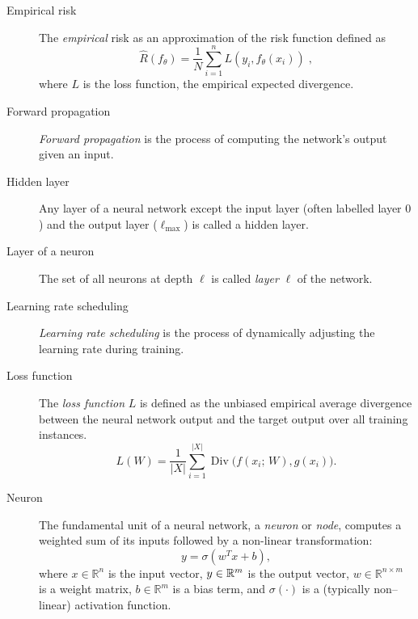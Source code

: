 \begin{description}
\item [Empirical risk]
            The \emph{empirical} risk as an approximation of the risk function defined as
            \begin{equation}
            \hat{{R}}(f_\theta) = \frac{1}{N}\sum_{i=1}^{n}L(y_i, f_\theta(x_i))\;,
        \end{equation}
        where \(L\) is the loss function, the empirical expected divergence.

\item [Forward propagation]
                \emph{Forward propagation} is the process of computing the network's output given an input.

\item [Hidden layer]
            Any layer of a neural network except the input layer (often labelled layer \(0\)) and the output layer (\(\ell_{\max}\)) is called a hidden layer.

\item [Layer of a neuron]
            The set of all neurons at depth \(\ell\) is called \emph{layer} \(\ell\) of the network.

\item [Learning rate scheduling]

                \emph{Learning rate scheduling} is the process of dynamically adjusting the learning rate during training.

\item [Loss function]
                The \emph{loss function} \(L\) is defined as the unbiased empirical average divergence between the neural network output and the target output over all training instances.
            \begin{equation}
                L(W) = \frac{1}{|X|}\sum_{i=1}^{|X|}\operatorname{Div}\Big(f(x_i;\,W), g(x_i)\Big).
            \end{equation}

\item [Neuron]
            The fundamental unit of a neural network, a \emph{neuron} or \emph{node}, computes a weighted sum of its inputs followed by a non-linear transformation:
            \begin{equation}
            y = \sigma(w^T x + b),
            \end{equation}
            where \(x \in \mathbb{R}^n\) is the input vector, \(y\in\mathbb{R}^{m}\) is the output vector, \(w \in \mathbb{R}^{n\times m}\) is a weight matrix, \(b \in \mathbb{R}^m\) is a bias term, and \(\sigma(\cdot)\) is a (typically non--linear) activation function.


\end{description}

